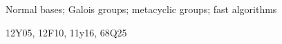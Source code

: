 \begin{keywords}
Normal bases; Galois groups; metacyclic groups; fast algorithms
\end{keywords}

\begin{subject}
12Y05, 12F10, 11y16, 68Q25
\end{subject}




\newcommand{\F}{{\mathsf{F}}}
\newcommand{\K}{{\mathsf{K}}}

\newcommand{\NN}{{\mathbb{N}}}
\newcommand{\N}{{\mathbb{N}}}

\def\A{\mathbb{A}}
\def\H{\mathbb{H}}
\def\B{\mathbb{B}}
\def\Z{\mathbb{Z}}
\def\C{\mathbb{C}}
\def\Q{\mathbb{Q}}
\def\D{\mathbb{D}}
\newcommand{\QQ}{\mathbb{Q}}
\newcommand{\mat}[1]{\mathbf{\MakeUppercase{#1}}} %

\newcommand{\osum}[2]{\alpha_{#1,#2}}
\newcommand{\osumcost}{O(n^{(3/4)\cdot \omega(4/3)})}
\newcommand{\osumcosttilde}{\tilde{O}(n^{(3/4)\cdot \omega(4/3)})}
\newcommand{\thecost}{\tilde{O}(n^{(3/4)\cdot \omega(4/3)})}

\newcommand{\FF}{{\mathbb{F}}}
\newcommand{\xbar}{\xi}
\newcommand{\zbar}{\zeta}
\newcommand{\alg}{quadratic\,}

\newcommand{\citeN}{\citet}






\noacknowledge%
                 









% 




